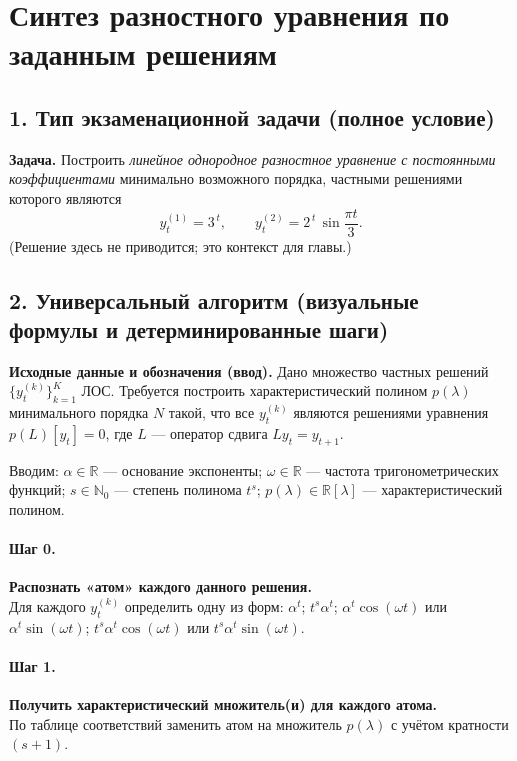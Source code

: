 \section{Синтез разностного уравнения по заданным решениям}

\subsection*{1. Тип экзаменационной задачи (полное условие)}
\textbf{Задача.} Построить \emph{линейное однородное разностное уравнение с постоянными коэффициентами} минимально возможного порядка, частными решениями которого являются
\[
y^{(1)}_{t}=3^{\,t},\qquad y^{(2)}_{t}=2^{\,t}\,\sin\!\frac{\pi t}{3}.
\]
(Решение здесь не приводится; это контекст для главы.)

\subsection*{2. Универсальный алгоритм (визуальные формулы и детерминированные шаги)}

\textbf{Исходные данные и обозначения (ввод).} Дано множество частных решений \(\{y^{(k)}_t\}_{k=1}^K\) ЛОС. Требуется построить характеристический полином \(p(\lambda)\) минимального порядка \(N\) такой, что все \(y^{(k)}_t\) являются решениями уравнения \(p(L)[y_t]=0\), где \(L\) — оператор сдвига \(Ly_t=y_{t+1}\).

Вводим: \(\alpha\in\mathbb{R}\) — основание экспоненты; \(\omega\in\mathbb{R}\) — частота тригонометрических функций; \(s\in\mathbb{N}_0\) — степень полинома \(t^s\); \(p(\lambda)\in\mathbb{R}[\lambda]\) — характеристический полином.

\paragraph{Шаг 0.} \textbf{Распознать «атом» каждого данного решения.}\\
Для каждого \(y^{(k)}_t\) определить одну из форм:
\(\alpha^t\); \(t^{s}\alpha^t\); \(\alpha^t\cos(\omega t)\) или \(\alpha^t\sin(\omega t)\); \(t^{s}\alpha^t\cos(\omega t)\) или \(t^{s}\alpha^t\sin(\omega t)\).

\paragraph{Шаг 1.} \textbf{Получить характеристический множитель(и) для каждого атома.}\\
По таблице соответствий заменить атом на множитель \(p(\lambda)\) с учётом кратности \((s+1)\).

